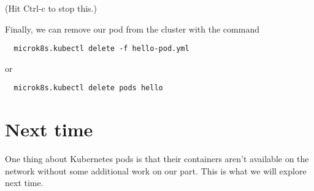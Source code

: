 \documentclass{article}
\begin{document}
(Hit Ctrl-c to stop this.)

Finally, we can remove our pod from the cluster with the command

\begin{verbatim}
  microk8s.kubectl delete -f hello-pod.yml
\end{verbatim} 

or

\begin{verbatim}
  microk8s.kubectl delete pods hello
\end{verbatim} 

\section{Next time}
One thing about Kubernetes pods is that their containers aren't available on the network without some additional work on our part. This is what we will explore next time.
\end{document}

